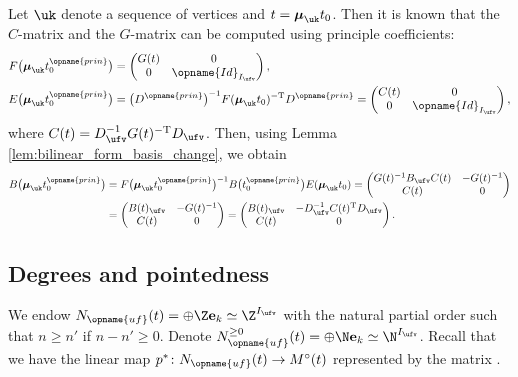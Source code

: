 \documentclass[pdftex]{sigma}
\newcommand{\Mc}{M^\circ}
\newcommand{\Nufv}{N_{\opname{uf}}}
\newcommand{\Iufv}{I_{\ufv}}
\newcommand{\Id}{{\opname{Id}}}
\newcommand{\prin}{{\opname{prin}}}
\newcommand{\seq}{\boldsymbol{\mu}}%
\newcommand{\ee}{\mathbf{e}}
\newcommand{\low}{\opname{\fv,\ufv}}
\numberwithin{equation}{section}
\begin{document}
Let $\uk$ denote a sequence of vertices and $t=\seq_{\uk}t_{0}$.
Then it is known that the $C$-matrix and the $G$-matrix can be computed
using principle coefficients:
\begin{align*}
F\big(\seq_{\uk}t_{0}^{\prin}\big) & =\left(\begin{matrix}
G(t) & 0\\
0 & \Id_{\Iufv}
\end{matrix}\right),\\
E\big(\seq_{\uk}t_{0}^{\prin}\big) & =\big(D^{\prin}\big)^{-1}F(\seq_{\uk}t_{0})^{\rm -T}D^{\prin}=\left(\begin{matrix}
C(t) & 0\\
0 & \Id_{\Iufv}
\end{matrix}\right),
\end{align*}
where $C(t)=D_{\ufv}^{-1}G(t)^{\rm -T}D_{\ufv}$. Then, using Lemma \ref{lem:bilinear_form_basis_change},
we obtain
\begin{align*}
B\big(\seq_{\uk}t_{0}^{\prin}\big) & =F\big(\seq_{\uk}t_{0}^{\prin}\big)^{-1}B\big(t_{0}^{\prin}\big)E(\seq_{\uk}t_{0}) =\left(\begin{matrix}
G(t)^{-1}B_{\ufv}C(t) & -G(t)^{-1}\\
C(t) & 0
\end{matrix}\right)\\
 & =\left(\begin{matrix}
B(t)_{\ufv} & -G(t)^{-1}\\
C(t) & 0
\end{matrix}\right)=\left(\begin{matrix}
B(t)_{\ufv} & -D_{\ufv}^{-1}C(t)^{\rm T}D_{\ufv}\\
C(t) & 0
\end{matrix}\right).
\end{align*}


\subsection{Degrees and pointedness}\label{sec:pointedness}

We endow $\Nufv(t)=\oplus\Z \ee_{k}\simeq\Z^{\Iufv}$ with the natural
partial order such that $n\geq n'$ if $n-n'\geq0$. Denote $\Nufv^{\geq0}(t)=\oplus\N \ee_{k}\simeq\N^{\Iufv}$.
Recall that we have the linear map $p^{*}\colon\Nufv(t)\rightarrow\Mc(t)$
represented by the matrix \smash{$\tB=\left(\begin{smallmatrix}
B_{\ufv}\\
B_{\low}
\end{smallmatrix}\right)$}.
\end{document}
